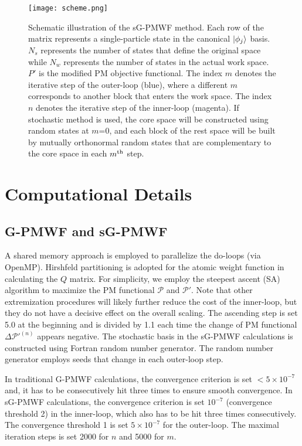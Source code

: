 \documentclass[journal=jacsat,manuscript=article]{achemso}
\begin{document}
\begin{figure*}
\texttt{[image: scheme.png]}
\caption{Schematic illustration of the sG-PMWF method. Each row of the matrix represents a single-particle state in the canonical $\ket{\phi_j}$ basis. $N_s$ represents the number of states that define the original space while $N_w$ represents the number of states in the actual work space. $P'$ is the modified PM objective functional. The index $m$ denotes the iterative step of the outer-loop (blue), where a different $m$ corresponds to another block that enters the work space. The index $n$ denotes the iterative step of the inner-loop (magenta). If stochastic method is used, the core space will be constructed using random states at $m$=0, and each block of the rest space will be built by mutually orthonormal random states that are complementary to the core space in each $m^{\rm th}$ step.}
\label{fig:fig_sG-PMWF}
\end{figure*}
    
\section{Computational Details}

\subsection{G-PMWF and sG-PMWF}
A shared memory approach is employed to parallelize the do-loops (via  OpenMP). Hirshfeld partitioning\cite{Hirshfeld1977} is adopted for the atomic weight function in calculating the $Q$ matrix. For simplicity, we employ the steepest ascent (SA) algorithm\cite{Silvestrelli1998,Silvestrelli1999,Thygesen2005} to maximize the PM functional $\mathcal{P}$ and $\mathcal{P}'$. Note that other extremization procedures will likely further reduce the cost of the inner-loop, but they do not have a decisive effect on the overall scaling.  The ascending step is set 5.0 at the beginning and is divided by 1.1 each time the change of PM functional $\Delta \mathcal{P}'^{(n)}$ appears negative. The stochastic basis in the sG-PMWF calculations is constructed using Fortran random number generator. The random number generator employs seeds that change in each outer-loop step. 

In traditional G-PMWF calculations, the convergence criterion is set $<5 \times 10^{-7}$ and, it has to be consecutively hit three times to ensure smooth convergence. In sG-PMWF calculations, the convergence criterion is set $10^{-7}$ (convergence threshold 2) in the inner-loop, which also has to be hit three times consecutively. The convergence threshold 1 is set $5 \times 10^{-7}$ for the outer-loop. The maximal iteration steps is set 2000 for $n$ and 5000 for $m$.
\end{document}
